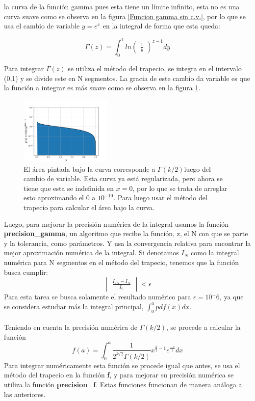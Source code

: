 \documentclass[letterpaper,oneside]{article}
\begin{document}
la curva de la función gamma pues esta tiene un límite infinito, esta no es una curva suave como se observa en la figura \ref{Funcion gamma sin c.v.}, por lo que se usa el cambio de variable $y=e^x$ en la integral de forma que esta queda:

$$\Gamma(z)=\int^1_0 ln\begin{pmatrix}
\frac{1}{y}
\end{pmatrix}^{z-1}dy$$

 Para integrar $\Gamma(z)$ se utiliza el método del trapecio, se  integra en el intervalo (0,1) y se divide este en N segmentos. La gracia de este cambio da variable es que la función a integrar es más suave como se observa en la figura \ref{Funcion gamma con c.v.}.
\begin{figure}[h]
\includegraphics[width=0.4\textwidth]{gamma con c.v..pdf}
\caption{El área pintada bajo la curva corresponde a $\Gamma(k/2)$luego del cambio de variable. Esta curva ya está regularizada, pero ahora se tiene que esta se indefinida en $x=0$, por lo que se trata de arreglar esto aproximando el 0 a $10^{-10}$. Para luego usar el método del trapecio para calcular el área bajo la curva.}
    \label{Funcion gamma con c.v.}
\centering
\end{figure}
 Luego, para mejorar la precisión numérica de la integral usamos la función \textbf{precision\_gamma}, un algoritmo que recibe la función, z, el N con que se parte y la tolerancia, como parámetros. Y usa la convergencia relativa para encontrar la mejor aproximación numérica de la integral. Si denotamos $I_N$ como la integral numérica para N segmentos en el método del trapecio, tenemos que la función busca cumplir:
 $$ \begin{vmatrix}
\frac{I_{2N}-I_N}{I_n}
\end{vmatrix}
<\epsilon$$
 Para esta tarea se busca solamente el resultado numérico para $\epsilon=10^-6$, ya que se considera estudiar más la integral principal, $\int^a_0pdf(x)dx$.
 \\ \\
 Teniendo en cuenta la precisión numérica de $\Gamma(k/2)$, se procede a calcular la función 
 $$f(a)=\int^a_{0}\frac{1}{2^{k/2} \Gamma(k/2)}x^{\frac{k}{2}-1 }e^{\frac{-x}{2}}dx $$
 Para integrar numéricamente esta función se procede igual que antes, se usa el método del trapecio en la función \textbf{f}, y para mejorar su precisión numérica se utiliza la función \textbf{precision\_f}. Estas funciones funcionan de manera análoga a las anteriores.
 
\end{document}
